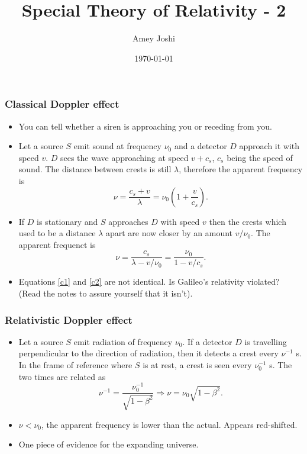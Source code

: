 \documentclass{beamer}
\title{Special Theory of Relativity - 2}
\author{Amey Joshi}
\date{\today}
\begin{document}
\begin{frame}
\titlepage
\end{frame}

\begin{frame}
\frametitle{Classical Doppler effect}
\begin{itemize}
\item You can tell whether a siren is approaching you or receding from you.
\item Let a source $S$ emit sound at frequency $\nu_0$ and a detector $D$ 
approach it with speed $v$. $D$ sees the wave approaching at speed $v+c_s$, 
$c_s$ being the speed of sound. The distance between crests is still $\lambda$,
therefore the apparent frequency is
\begin{equation}\label{c1}
\nu = \frac{c_s+v}{\lambda} = \nu_0\left(1 + \frac{v}{c_s}\right).
\end{equation}
\item If $D$ is stationary and $S$ approaches $D$ with speed $v$ then the
crests which used to be a distance $\lambda$ apart are now closer by an amount
$v/\nu_0$. The apparent frequenct is
\begin{equation}\label{c2}
\nu = \frac{c_s}{\lambda - v/\nu_0} = \frac{\nu_0}{1 - v/c_s}.
\end{equation}
\item Equations \eqref{c1} and \eqref{c2} are not identical. Is Galileo's 
relativity violated? (Read the notes to assure yourself that it isn't).
\end{itemize}
\end{frame}

\begin{frame}
\frametitle{Relativistic Doppler effect}
\begin{itemize}
\item Let a source $S$ emit radiation of frequency $\nu_0$. If a detector $D$
is travelling perpendicular to the direction of radiation, then it detects a 
crest every $\nu^{-1}$ s. In the frame of reference where $S$ is at rest, a 
crest is seen every $\nu_0^{-1}$ s. The two times are related as
\begin{equation}\label{e3}
\nu^{-1} = \frac{\nu_0^{-1}}{\sqrt{1 - \beta^2}} \Rightarrow
\nu = \nu_0\sqrt{1 - \beta^2}.
\end{equation}
\item $\nu < \nu_0$, the apparent frequency is lower than the actual. Appears
red-shifted.
\item One piece of evidence for the expanding universe.
\end{itemize}
\end{frame}
\end{document}
